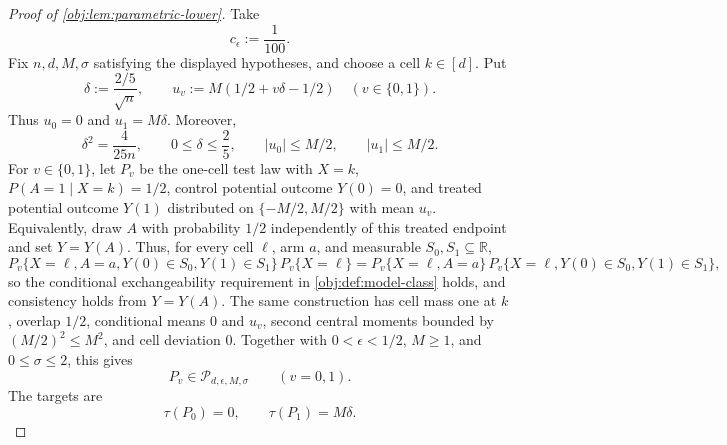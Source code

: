 \documentclass[11pt]{article}
\begin{document}
\begin{proof}[Proof of \cref{obj:lem:parametric-lower}]
Take
\[
c_\epsilon:=\frac1{100}.
\]
Fix \(n,d,M,\sigma\) satisfying the displayed hypotheses, and choose a cell \(k\in[d]\).  Put
\[
\delta:=\frac{2/5}{\sqrt n},
\qquad
u_v:=M(1/2+v\delta-1/2)\quad (v\in\{0,1\}).
\]
Thus \(u_0=0\) and \(u_1=M\delta\).  Moreover,
\[
\delta^2=\frac{4}{25n},
\qquad
0\le\delta\le\frac25,
\qquad
|u_0|\le M/2,
\qquad
|u_1|\le M/2 .
\]
For \(v\in\{0,1\}\), let \(P_v\) be the one-cell test law with \(X=k\), \(P(A=1\mid X=k)=1/2\), control potential outcome \(Y(0)=0\), and treated potential outcome \(Y(1)\) distributed on \(\{-M/2,M/2\}\) with mean \(u_v\).  Equivalently, draw \(A\) with probability \(1/2\) independently of this treated endpoint and set \(Y=Y(A)\).  Thus, for every cell \(\ell\), arm \(a\), and measurable \(S_0,S_1\subseteq\mathbb R\),
\[
P_v\{X=\ell,A=a,Y(0)\in S_0,Y(1)\in S_1\}\,P_v\{X=\ell\}
=
P_v\{X=\ell,A=a\}\,P_v\{X=\ell,Y(0)\in S_0,Y(1)\in S_1\},
\]
so the conditional exchangeability requirement in \cref{obj:def:model-class} holds, and consistency holds from \(Y=Y(A)\).  The same construction has cell mass one at \(k\), overlap \(1/2\), conditional means \(0\) and \(u_v\), second central moments bounded by \((M/2)^2\le M^2\), and cell deviation \(0\).  Together with \(0<\epsilon<1/2\), \(M\ge1\), and \(0\le\sigma\le2\), this gives
\[
P_v\in\mathcal P_{d,\epsilon,M,\sigma}
\qquad (v=0,1).
\]
The targets are
\[
\tau(P_0)=0,
\qquad
\tau(P_1)=M\delta .
\]


\end{proof}
\end{document}
